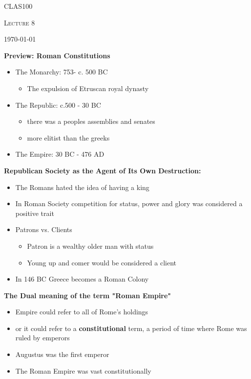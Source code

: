 \documentclass[12pt,a4paper]{report}
\begin{document}
	\centering
	{\scshape\LARGE CLAS100 \par}
	{\scshape\Large Lecture 8\par}
	{\large \today\par}
	\vspace{1.5cm}
	
\textbf{Preview: Roman Constitutions}
\begin{itemize}
\item The Monarchy: 753- c. 500 BC
\begin{itemize}
\item The expulsion of Etruscan royal dynasty
\end{itemize}
\item The Republic: c.500 - 30 BC
\begin{itemize}
\item there was a peoples assemblies and senates
\item more elitist than the greeks
\end{itemize}
\item The Empire: 30 BC - 476 AD
\end{itemize}
\textbf{Republican Society as the Agent of Its Own Destruction:}
\begin{itemize}
\item The Romans hated the idea of having a king
\item In Roman Society competition for status, power and glory was considered a positive trait
\item Patrons vs. Clients
\begin{itemize}
\item Patron is a wealthy older man with status
\item Young up and comer would be considered a client
\end{itemize}
\item In 146 BC Greece becomes a Roman Colony
\end{itemize}
\textbf{The Dual meaning of the term "Roman Empire"}
\begin{itemize}
\item Empire could refer to all of Rome's holdings
\item or it could refer to a \textbf{constitutional} term, a period of time where Rome was ruled by emperors
\item Augustus was the first emperor
\item The Roman Empire was vast constitutionally
\end{itemize}
\end{document}
